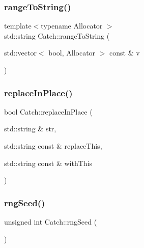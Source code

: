 \mbox{\label{namespace_catch_ae162dc66b7767a52e7e4283915fd3d9f}} 
\subsubsection{\texorpdfstring{range\+To\+String()}{rangeToString()}\hspace{0.1cm}{\footnotesize\ttfamily [2/2]}}
{\footnotesize\ttfamily template$<$typename Allocator $>$ \\
std\+::string Catch\+::range\+To\+String (\begin{DoxyParamCaption}\item[{std\+::vector$<$ bool, Allocator $>$ const \&}]{v }\end{DoxyParamCaption})}

\mbox{\label{namespace_catch_afe4e6770da547e43e9e4eeaa05f946ea}} 
\subsubsection{\texorpdfstring{replace\+In\+Place()}{replaceInPlace()}}
{\footnotesize\ttfamily bool Catch\+::replace\+In\+Place (\begin{DoxyParamCaption}\item[{std\+::string \&}]{str,  }\item[{std\+::string const \&}]{replace\+This,  }\item[{std\+::string const \&}]{with\+This }\end{DoxyParamCaption})}

\mbox{\label{namespace_catch_acf5ea05e942d2d7fe79111e12754ed76}} 
\subsubsection{\texorpdfstring{rng\+Seed()}{rngSeed()}}
{\footnotesize\ttfamily unsigned int Catch\+::rng\+Seed (\begin{DoxyParamCaption}{ }\end{DoxyParamCaption})}

\mbox{\label{namespace_catch_a7f7480b15d74965459c844f0d393ed87}} 
